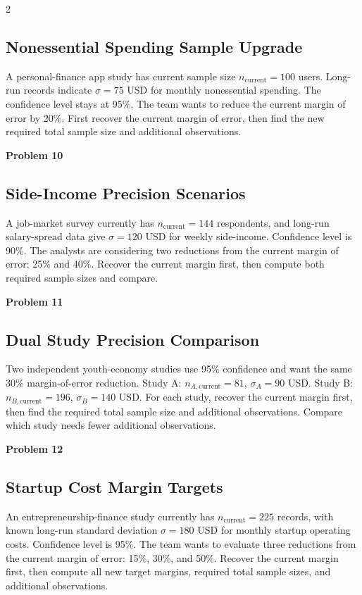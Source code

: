 \documentclass[12pt]{article}
\newcommand{\SubsectionBox}[1]{%
	\noindent\colorbox{gray!30}{\parbox{\linewidth}{\textbf{#1}}}\par\vspace{0.35cm}%
}
\begin{document}
\begin{multicols}{2}
		\subsection*{Nonessential Spending Sample Upgrade}
		A personal-finance app study has current sample size $n_{\text{current}} = 100$ users. Long-run records indicate $\sigma = 75$ USD for monthly nonessential spending. The confidence level stays at 95\%. The team wants to reduce the current margin of error by 20\%. First recover the current margin of error, then find the new required total sample size and additional observations.
		
		\vspace{0.5cm}
		\SubsectionBox{Problem 10}
		\subsection*{Side-Income Precision Scenarios}
		A job-market survey currently has $n_{\text{current}} = 144$ respondents, and long-run salary-spread data give $\sigma = 120$ USD for weekly side-income. Confidence level is 90\%. The analysts are considering two reductions from the current margin of error: 25\% and 40\%. Recover the current margin first, then compute both required sample sizes and compare.
		
		\vspace{0.5cm}
		\SubsectionBox{Problem 11}
		\subsection*{Dual Study Precision Comparison}
		Two independent youth-economy studies use 95\% confidence and want the same 30\% margin-of-error reduction.
		Study A: $n_{A,\text{current}} = 81$, $\sigma_A = 90$ USD.
		Study B: $n_{B,\text{current}} = 196$, $\sigma_B = 140$ USD.
		For each study, recover the current margin first, then find the required total sample size and additional observations. Compare which study needs fewer additional observations.
		
		\vspace{0.5cm}
		\SubsectionBox{Problem 12}
		\subsection*{Startup Cost Margin Targets}
		An entrepreneurship-finance study currently has $n_{\text{current}} = 225$ records, with known long-run standard deviation $\sigma = 180$ USD for monthly startup operating costs. Confidence level is 95\%. The team wants to evaluate three reductions from the current margin of error: 15\%, 30\%, and 50\%. Recover the current margin first, then compute all new target margins, required total sample sizes, and additional observations.
		
	\end{multicols}
	
\end{document}
